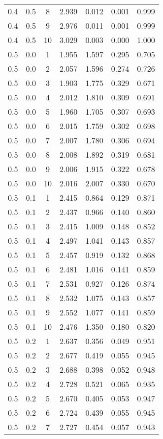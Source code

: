 \begin{tabular}{|c|c|c|c|c|c|c|}
0.4 & 0.5 & 8 & 2.939 & 0.012 & 0.001 & 0.999 \\
0.4 & 0.5 & 9 & 2.976 & 0.011 & 0.001 & 0.999 \\
0.4 & 0.5 & 10 & 3.029 & 0.003 & 0.000 & 1.000 \\
0.5 & 0.0 & 1 & 1.955 & 1.597 & 0.295 & 0.705 \\
0.5 & 0.0 & 2 & 2.057 & 1.596 & 0.274 & 0.726 \\
0.5 & 0.0 & 3 & 1.903 & 1.775 & 0.329 & 0.671 \\
0.5 & 0.0 & 4 & 2.012 & 1.810 & 0.309 & 0.691 \\
0.5 & 0.0 & 5 & 1.960 & 1.705 & 0.307 & 0.693 \\
0.5 & 0.0 & 6 & 2.015 & 1.759 & 0.302 & 0.698 \\
0.5 & 0.0 & 7 & 2.007 & 1.780 & 0.306 & 0.694 \\
0.5 & 0.0 & 8 & 2.008 & 1.892 & 0.319 & 0.681 \\
0.5 & 0.0 & 9 & 2.006 & 1.915 & 0.322 & 0.678 \\
0.5 & 0.0 & 10 & 2.016 & 2.007 & 0.330 & 0.670 \\
0.5 & 0.1 & 1 & 2.415 & 0.864 & 0.129 & 0.871 \\
0.5 & 0.1 & 2 & 2.437 & 0.966 & 0.140 & 0.860 \\
0.5 & 0.1 & 3 & 2.415 & 1.009 & 0.148 & 0.852 \\
0.5 & 0.1 & 4 & 2.497 & 1.041 & 0.143 & 0.857 \\
0.5 & 0.1 & 5 & 2.457 & 0.919 & 0.132 & 0.868 \\
0.5 & 0.1 & 6 & 2.481 & 1.016 & 0.141 & 0.859 \\
0.5 & 0.1 & 7 & 2.531 & 0.927 & 0.126 & 0.874 \\
0.5 & 0.1 & 8 & 2.532 & 1.075 & 0.143 & 0.857 \\
0.5 & 0.1 & 9 & 2.552 & 1.077 & 0.141 & 0.859 \\
0.5 & 0.1 & 10 & 2.476 & 1.350 & 0.180 & 0.820 \\
0.5 & 0.2 & 1 & 2.637 & 0.356 & 0.049 & 0.951 \\
0.5 & 0.2 & 2 & 2.677 & 0.419 & 0.055 & 0.945 \\
0.5 & 0.2 & 3 & 2.688 & 0.398 & 0.052 & 0.948 \\
0.5 & 0.2 & 4 & 2.728 & 0.521 & 0.065 & 0.935 \\
0.5 & 0.2 & 5 & 2.670 & 0.405 & 0.053 & 0.947 \\
0.5 & 0.2 & 6 & 2.724 & 0.439 & 0.055 & 0.945 \\
0.5 & 0.2 & 7 & 2.727 & 0.454 & 0.057 & 0.943 \\

\end{tabular}
